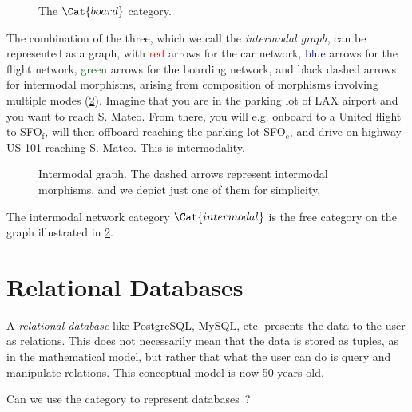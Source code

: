 \begin{example}
    \begin{figure}[h!]
        \begin{center}
        \end{center}
        \caption{The $\Cat{board}$ category. \label{fig:boarding}}
    \end{figure}

    The combination of the three, which we call the \emph{intermodal graph}, can be represented as a graph, with \textcolor{red}{red} arrows for the car network, \textcolor{blue}{blue} arrows for the flight network, \textcolor{darkgreen}{green} arrows for the boarding network, and black dashed arrows for intermodal morphisms, arising from composition of morphisms involving multiple modes (\cref{fig:intermodal}). Imagine that you are in the parking lot of \textsf{LAX} airport and you want to reach \textsf{S. Mateo}. From there, you will e.g. onboard to a \textsf{United} flight to \textsf{SFO}$_\mathrm{f}$, will then offboard reaching the parking lot \textsf{SFO}$_\mathrm{c}$, and drive on highway \textsf{US-101} reaching \textsf{S. Mateo}. This is intermodality.

    \begin{figure}[h!]
        \begin{center}
            {}
        \end{center}
        \caption{Intermodal graph. The dashed arrows represent intermodal morphisms, and we depict just one of them for simplicity. \label{fig:intermodal}
        }
    \end{figure}
\end{example}

The intermodal network category $\Cat{intermodal}$ is the free category on the graph illustrated in \cref{fig:intermodal}.


\section{Relational Databases}
\label{sec:relational-databases}

A \emph{relational database} like PostgreSQL, MySQL, etc. presents
the data to the user as relations. This does not necessarily mean
that the data is stored as tuples, as in the mathematical model, but
rather that what the user can do is query and manipulate relations.
This conceptual model is now 50 years old.

Can we use the category \Rel to represent databases~\cite{codd2002relational}?


